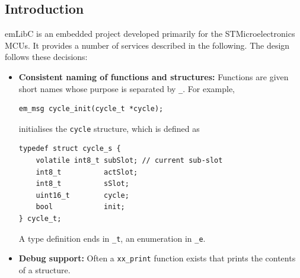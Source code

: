\subsection{Introduction}
emLibC is an embedded project developed primarily for the STMicroelectronics
MCUs. It provides a number of services described in the following. The design
follows these decisions:
\begin{itemize}
\item {\bf Consistent naming of functions and structures:} Functions are
given short names whose purpose is separated by \verb|_|. For example,
\begin{verbatim}
em_msg cycle_init(cycle_t *cycle);
\end{verbatim}
initialises the \verb|cycle| structure, which is defined as
\begin{verbatim}
typedef struct cycle_s {
    volatile int8_t subSlot; // current sub-slot
    int8_t          actSlot;
    int8_t          sSlot;
    uint16_t        cycle;
    bool            init;
} cycle_t;
\end{verbatim}
A type definition ends in \verb|_t|, an enumeration in \verb|_e|.
\item {\bf Debug support:} Often a \verb|xx_print| function exists that prints
the contents of a structure.
\end{itemize}
